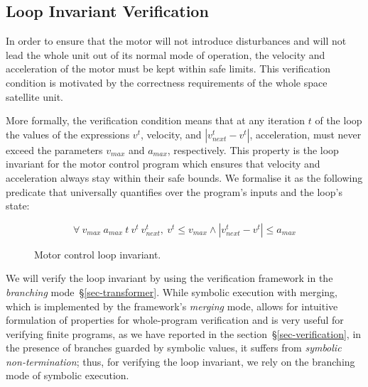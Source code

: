 \subsection{Loop Invariant Verification}

In order to ensure that the motor will not introduce disturbances
and will not lead the whole unit out of its normal mode of operation, the velocity and
acceleration of the motor must be kept within safe limits. This verification condition
is motivated by the correctness requirements of the whole space satellite unit.

More formally, the verification condition means
that at any iteration $t$ of the loop the values of the
expressions $v^t$, velocity, and $\left| v^t_{next} - v^t \right|$,
acceleration, must never exceed the parameters $v_{max}$ and $a_{max}$, respectively.
This property is the loop invariant for the motor control program which
ensures that velocity and acceleration always stay within their safe bounds. We
formalise it as the following predicate that universally quantifies over the
program's inputs and the loop's state:

\vspace{1mm}
\begin{figure}[H]
\begin{tcolorbox}
\LARGE{
\[
  \forall\ v_{max}\ a_{max}\ t\ v^t\ v^t_{next},\ v^t \leq v_{max} \land \left| v^t_{next} - v^t \right| \leq a_{max}
\]}
\end{tcolorbox}
\caption{Motor control loop invariant.\label{fig-loop-invariant}}
\end{figure}

\noindent
We will verify the loop invariant by using the verification framework in the
\emph{branching} mode~\S\ref{sec-transformer}. While symbolic execution with
merging, which is implemented by the framework's \emph{merging} mode, allows
for intuitive formulation of properties for whole-program verification and
is very useful for verifying finite programs, as we have
reported in the section~\S\ref{sec-verification}, in the presence of branches
guarded by symbolic values, it suffers from \emph{symbolic non-termination};
thus, for verifying the loop invariant, we rely on the branching mode of
symbolic execution.

